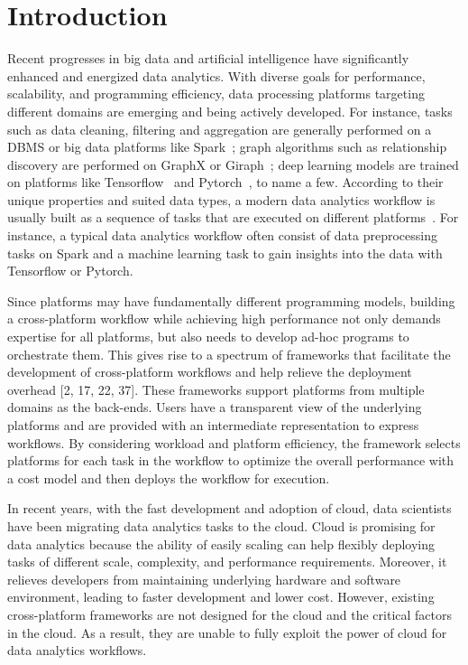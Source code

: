\section{Introduction}

Recent progresses in big data and artificial intelligence have significantly enhanced and energized data analytics.  With diverse goals for performance, scalability, and programming efficiency, data processing platforms targeting different domains are emerging and being actively developed. For instance, tasks such as data cleaning, filtering and aggregation are generally
performed on a DBMS or big data platforms like Spark~\cite{}; graph algorithms such as relationship discovery are performed on GraphX or Giraph~\cite{}; deep learning models are trained on platforms like Tensorflow~\cite{} and Pytorch~\cite{}, to name a few.
According to their unique properties and suited data types, a modern data analytics workflow is usually built as a sequence of tasks that are executed on different platforms~\cite{}. For instance, a typical data analytics workflow often consist of data preprocessing tasks on Spark and
a machine learning task to gain insights into the data with Tensorflow or Pytorch. 

Since platforms may have fundamentally different programming
models, building a cross-platform workflow while achieving high
performance not only demands expertise for all platforms, but also
needs to develop ad-hoc programs to orchestrate them. This
gives rise to a spectrum of frameworks that facilitate the development
of cross-platform workflows and help relieve the deployment overhead [2, 17, 22, 37]. 
These frameworks support platforms from multiple domains as the back-ends. Users have a transparent view of the underlying platforms and are provided with an intermediate representation to express workflows. 
By considering workload and platform efficiency, the framework selects platforms for each task in the workflow to optimize the overall performance with a cost model and then deploys the workflow for execution.

In recent years, with the fast development and adoption of cloud, data scientists have been migrating data analytics tasks to the cloud. Cloud is promising for data analytics because the ability of easily scaling can 
help flexibly deploying tasks of different scale, complexity, and performance requirements. Moreover, it relieves developers from maintaining underlying hardware and software environment, leading to faster development and lower cost. However, existing cross-platform frameworks are not designed for the cloud and the critical factors in the cloud. As a result, they are unable to fully exploit the power of cloud for data analytics workflows.

